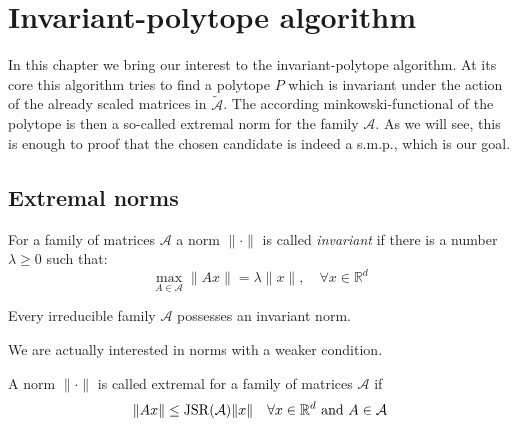 
\chapter{Invariant-polytope algorithm}
\label{ch:inv.poly}	

In this chapter we bring our interest to the invariant-polytope algorithm. 
At its core this algorithm tries to find a polytope $P$ which is invariant under the action of the already scaled matrices in $\tilde{\mathcal{A}}$. The according minkowski-functional of the polytope is then a so-called extremal norm for the family $\mathcal{A}$.
As we will see, this is enough to proof that the chosen candidate is indeed a s.m.p., which is our goal.

\section{Extremal norms}
\label{sec:extremal-norms}

\begin{definition}
    For a family of matrices $\mathcal{A}$ a norm $\lVert \cdot \rVert$ is called \emph{invariant} if there is a number $\lambda \geq 0$ such that:
    $$\max\limits_{A \in \mathcal{A}}\lVert A x \rVert = \lambda \lVert x \rVert, \quad \forall x \in \mathbb{R}^d$$
\end{definition}

\begin{theorem}
    \citep{barabanov1988lyapunov} Every irreducible family $\mathcal{A}$ possesses an invariant norm.
\end{theorem}

We are actually interested in norms with a weaker condition.

\begin{definition}
    A norm $\lVert \cdot \rVert$ is called extremal for a family of matrices $\mathcal{A}$ if 
    $$\lVert A x \rVert \leq \operatorname{JSR}(\mathcal{A}) \lVert x \rVert \quad \forall x \in \mathbb{R}^d \text{ and } A \in \mathcal{A}$$
\end{definition}

